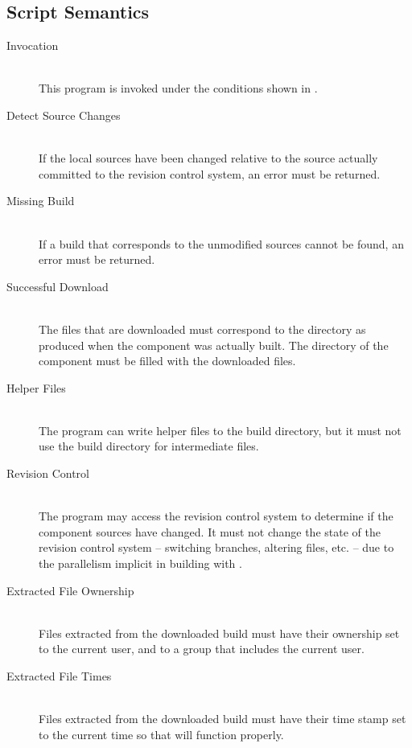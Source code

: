 \subsection{Script Semantics}

\begin{description}
\item[Invocation] \mbox{} \\

  This program is invoked under the conditions shown in
  .

\item[Detect Source Changes] \mbox{} \\

  If the local sources have been changed relative to the source
  actually committed to the revision control system, an error must be
  returned.

\item[Missing Build] \mbox{} \\

  If a build that corresponds to the unmodified sources cannot be
  found, an error must be returned.

\item[Successful Download] \mbox{} \\

  The files that are downloaded must correspond to the \destdir
  directory as produced when the component was actually built.  The
  \destdir directory of the component must be filled with the
  downloaded files.

\item[Helper Files] \mbox{} \\

  The program can write helper files to the build directory, but it
  must not use the build directory for intermediate files.

\item[Revision Control] \mbox{} \\

  The program may access the revision control system to determine if
  the component sources have changed.  It must not change the state of
  the revision control system -- switching branches, altering files,
  etc. -- due to the parallelism implicit in building with \lmsbw.

\item[Extracted File Ownership] \mbox{} \\

  Files extracted from the downloaded build must have their ownership
  set to the current user, and to a group that includes the current
  user.

\item[Extracted File Times] \mbox{} \\

  Files extracted from the downloaded build must have their time stamp
  set to the current time so that \make will function properly.

\end{description}

